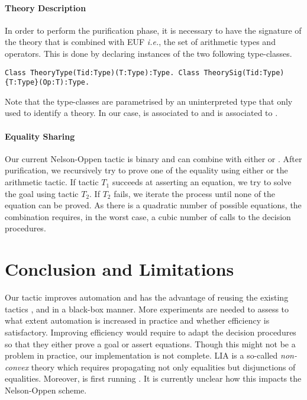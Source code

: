\documentclass{easychair}
\begin{document}
\paragraph{Theory Description} In order to perform the purification
phase, it is necessary to have the signature of the theory that is combined with EUF
\emph{i.e.}, the set of arithmetic types and operators.
%
This is done by declaring instances of the two following type-classes.
\begin{verbatim}
Class TheoryType(Tid:Type)(T:Type):Type. Class TheorySig(Tid:Type){T:Type}(Op:T):Type.
\end{verbatim}
Note that the type-classes are parametrised by an uninterpreted type
 that only used to identify a theory. In our case,  is associated to
 and  is associated to .

\paragraph{Equality Sharing} Our current Nelson-Oppen tactic is binary and can combine
 with either  or .
%
After purification, we recursively try to prove one of the equality
using either  or the arithmetic tactic.  If tactic
$T_1$ succeeds at asserting an equation, we try to solve the goal
using tactic $T_2$. If $T_2$ fails, we iterate the process until none
of the equation can be proved.
%
As there is a quadratic number of possible equations, the combination
requires, in the worst case, a cubic number of calls to the decision
procedures.

\section{Conclusion and Limitations}
Our  tactic improves automation and has the advantage of
reusing the existing tactics ,  and  in a
black-box manner. More experiments are needed to assess to what extent 
automation is increased in practice and whether efficiency is satisfactory.
%
Improving efficiency would require to adapt the decision procedures so
that they either prove a goal or assert equations.
%
Though this might not be a problem in practice, our implementation is
not complete. LIA is a so-called \emph{non-convex} theory which
requires propagating not only equalities but disjunctions of
equalities. Moreover,  is first running . It is
currently unclear how this impacts the Nelson-Oppen scheme. 

\label{sect:bib}

%
%
%

\end{document}
